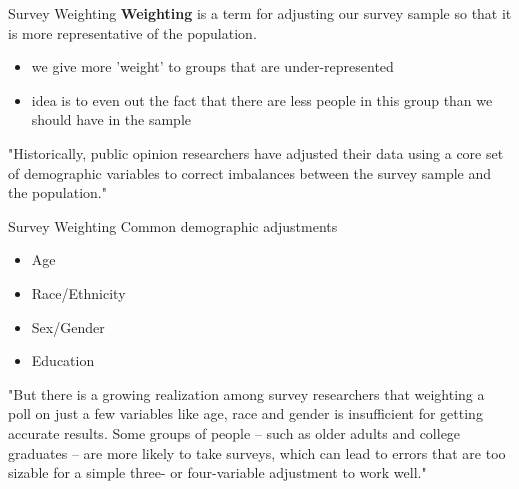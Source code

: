 \documentclass{beamer}
\begin{document}
\begin{frame}{Survey Weighting}
\textbf{Weighting} is a term for adjusting our survey sample so that it is more representative of the population.
\begin{itemize}
    \item we give more 'weight' to groups that are under-represented
    \item idea is to even out the fact that there are less people in this group than we should have in the sample
\end{itemize} \vspace{6mm}

"Historically, public opinion researchers have adjusted their data using a core set of demographic variables to correct imbalances between the survey sample and the population."
\end{frame}

\begin{frame}{Survey Weighting}
Common demographic adjustments
\begin{itemize}
    \item Age
    \item Race/Ethnicity
    \item Sex/Gender
    \item Education
\end{itemize} \vspace{5mm}

"But there is a growing realization among survey researchers that weighting a poll on just a few variables like age, race and gender is insufficient for getting accurate results. Some groups of people – such as older adults and college graduates – are more likely to take surveys, which can lead to errors that are too sizable for a simple three- or four-variable adjustment to work well." 
\end{frame}
\end{document}
